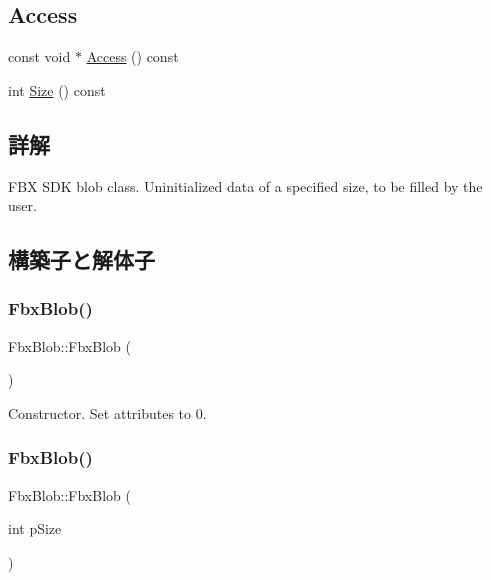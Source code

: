 \subsection*{Access}
\begin{DoxyCompactItemize}
\item 
const void $\ast$ \hyperlink{class_fbx_blob_a5fb39826dd62378bcf18b4de9db38509}{Access} () const
\item 
int \hyperlink{class_fbx_blob_a4b391b461d5303f6a1f24ae910b4e5c8}{Size} () const
\end{DoxyCompactItemize}


\subsection{詳解}
F\+BX S\+DK blob class. Uninitialized data of a specified size, to be filled by the user. 

\subsection{構築子と解体子}
\mbox{\label{class_fbx_blob_ad1013b102b7e2b54e5cb3ffe326e0738}} 
\subsubsection{\texorpdfstring{Fbx\+Blob()}{FbxBlob()}\hspace{0.1cm}{\footnotesize\ttfamily [1/4]}}
{\footnotesize\ttfamily Fbx\+Blob\+::\+Fbx\+Blob (\begin{DoxyParamCaption}{ }\end{DoxyParamCaption})}



Constructor. Set attributes to 0. 

\mbox{\label{class_fbx_blob_aaab0ee64d11daa7aff57542daad4105e}} 
\subsubsection{\texorpdfstring{Fbx\+Blob()}{FbxBlob()}\hspace{0.1cm}{\footnotesize\ttfamily [2/4]}}
{\footnotesize\ttfamily Fbx\+Blob\+::\+Fbx\+Blob (\begin{DoxyParamCaption}\item[{int}]{p\+Size }\end{DoxyParamCaption})}

